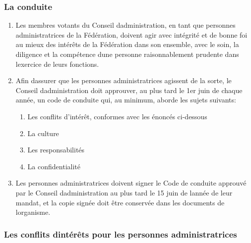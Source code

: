 \subsubsection{La conduite}
\label{la-conduite}

\begin{enumerate}
 \item
  Les membres votants du Conseil d\textquotesingle administration, en tant que personnes administratrices de la Fédération, doivent agir avec intégrité et de bonne foi au mieux des intérêts de la Fédération dans son ensemble, avec le soin, la diligence et la compétence d\textquotesingle une personne raisonnablement prudente dans l\textquotesingle exercice de leurs fonctions.
 \item
  Afin d\textquotesingle assurer que les personnes administratrices agissent de la sorte, le Conseil d\textquotesingle administration doit approuver, au plus tard le 1er juin de chaque année, un code de conduite qui, au minimum, aborde les sujets suivants:

  \begin{enumerate}
   \item
    Les conflits d'intérêt, conformes avec les énoncés ci-dessous
   \item
    La culture
   \item
    Les responsabilités
   \item
    La confidentialité
  \end{enumerate}
 \item
  Les personnes administratrices doivent signer le Code de conduite approuvé par le Conseil d\textquotesingle administration au plus tard le 15 juin de l\textquotesingle année de leur mandat, et la copie signée doit être conservée dans les documents de l\textquotesingle organisme.
\end{enumerate}

\subsubsection{Les conflits d\textquotesingle intérêts pour les personnes administratrices}
\label{les-conflits-d-interets-pour-les-personnes-administratrices}

